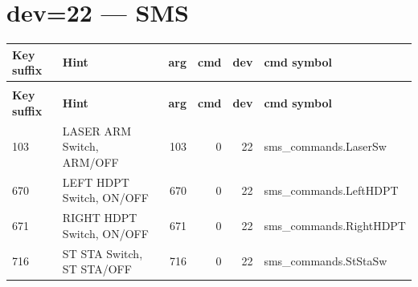 \documentclass[10pt,a4paper]{article}
\begin{document}
\section{dev=22 — SMS}
\begin{longtable}{>{\ttfamily\small}p{38mm} >{\small}p{72mm} r r r >{\ttfamily\small}p{48mm}}
\toprule
\textbf{Key suffix} & \textbf{Hint} & \textbf{arg} & \textbf{cmd} & \textbf{dev} & \textbf{cmd symbol} \\
\midrule
\endfirsthead
\multicolumn{6}{l}{\small\itshape continued\ldots}\\
\toprule
\textbf{Key suffix} & \textbf{Hint} & \textbf{arg} & \textbf{cmd} & \textbf{dev} & \textbf{cmd symbol} \\
\midrule
\endhead
\bottomrule
\endfoot
\rowcolor{rowodd}
  103 & LASER ARM Switch, ARM/OFF & 103 & 0 & 22 & sms\_commands.LaserSw \\
  670 & LEFT HDPT Switch, ON/OFF & 670 & 0 & 22 & sms\_commands.LeftHDPT \\
\rowcolor{rowodd}
  671 & RIGHT HDPT Switch, ON/OFF & 671 & 0 & 22 & sms\_commands.RightHDPT \\
  716 & ST STA Switch, ST STA/OFF & 716 & 0 & 22 & sms\_commands.StStaSw \\
\end{longtable}
\end{document}
